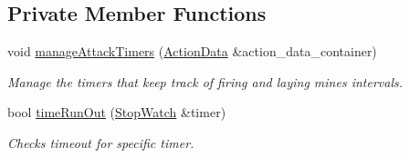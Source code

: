 \subsection*{Private Member Functions}
\begin{DoxyCompactItemize}
\item 
void \hyperlink{classGameStateManager_a5b61abb4ee2058208277bc7e6e19eda9}{manage\-Attack\-Timers} (\hyperlink{classActionData}{Action\-Data} \&action\-\_\-data\-\_\-container)
\begin{DoxyCompactList}\small\item\em Manage the timers that keep track of firing and laying mines intervals. \end{DoxyCompactList}\item 
bool \hyperlink{classGameStateManager_af8588ab062f78314e0d22faefae3c834}{time\-Run\-Out} (\hyperlink{classStopWatch}{Stop\-Watch} \&timer)
\begin{DoxyCompactList}\small\item\em Checks timeout for specific timer. \end{DoxyCompactList}\end{DoxyCompactItemize}

